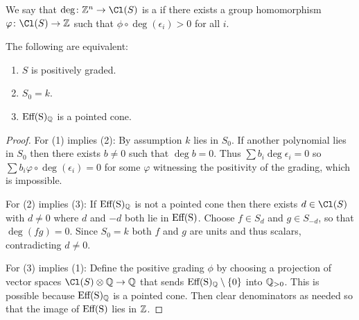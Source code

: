 \documentclass{amsart}
\begin{document}
\begin{defn}\label{defn:posGrading}
  We say that $\deg\colon\ZZ^n\to\Cl(S)$ is a  if there exists a group homomorphism $\phi\colon \Cl(S) \to \ZZ$ such that $\phi \circ \deg(\epsilon_i) > 0 $ for all $i$.
\end{defn}
\begin{lemma}\label{lem:positive-gradings}
  The following are equivalent:
  \begin{enumerate}
    \item $S$ is positively graded.
    \item $S_0=k$.
    \item $\rm Eff(S)_{\mathbb Q}$ is a pointed cone.
  \end{enumerate}
\end{lemma}
\begin{proof}
    For (1) implies (2):  By assumption $k$ lies in $S_0$.  If another polynomial lies in $S_0$ then there exists $b\neq 0$ such that $\deg b=0$.  Thus $\sum b_i\deg\epsilon_i=0$ so $\sum b_i\varphi\circ\deg(\epsilon_i)=0$ for some $\varphi$ witnessing the positivity of the grading, which is impossible.

    For (2) implies (3):  If $\rm Eff(S)_{\mathbb Q}$ is not a pointed cone then there exists $d\in \Cl(S)$ with $d\neq 0$ where $d$ and $-d$ both lie in $\rm Eff(S)$.  Choose $f\in S_d$ and $g\in S_{-d}$, so that $\deg(fg)=0$.  Since $S_0=k$ both $f$ and $g$ are units and thus scalars, contradicting $d\neq 0$.

    For (3) implies (1):  Define the positive grading $\phi$ by choosing a projection of vector spaces $\Cl(S)\otimes \QQ\to \QQ$ that sends $\rm Eff(S)_{\mathbb Q}\setminus \{0\}$ into $\mathbb Q_{>0}$.  This is possible because $\rm Eff(S)_{\mathbb Q}$ is a pointed cone. Then clear denominators as needed so that the image of $\rm Eff(S)$ lies in $\mathbb Z$.
  \end{proof}
\end{document}
